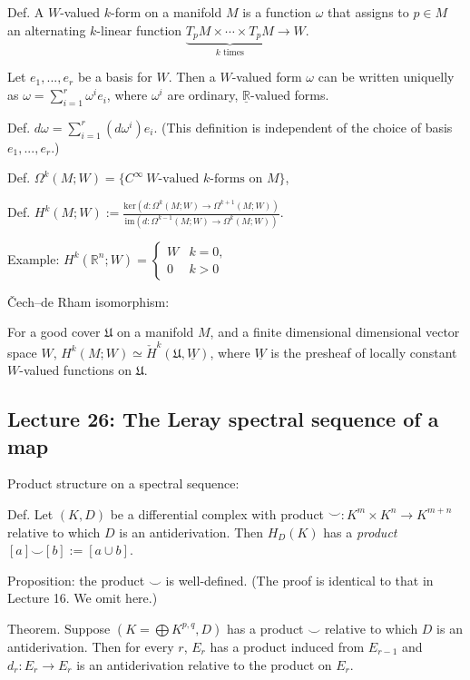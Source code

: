 \documentclass{article}
\theoremstyle{mystyle}
\theoremstyle{remark}
\numberwithin{equation}{section}
\begin{document}
Def. A $W$-valued $k$-form on a manifold $M$ is a function $\omega$ that assigns to $p\in M$ an alternating $k$-linear function $\underbrace{T_pM\times \cdots \times T_pM}_{k\text{ times}}\rightarrow W$. 

Let $e_1,...,e_r$ be a basis for $W$. Then a $W$-valued form $\omega$ can be written uniquelly as $\omega = \sum_{i=1}^r \omega^ie_i$, where $\omega^i$ are ordinary, $\underline{\mathbb{R}}$-valued forms.

Def. $d\omega = \sum_{i=1}^r (d\omega^i)e_i$. (This definition is independent of the choice of basis $e_1,...,e_r$.)

Def. $\Omega^k(M;W)= \{C^\infty~W\text{-valued }k\text{-forms on }M\}$, 

Def. $H^k(M;W):= \frac{\mathrm{ker}\left(d\colon \Omega^k(M;W)\rightarrow \Omega^{k+1}(M;W)\right)}{\mathrm{im}\left(d\colon \Omega^{k-1}(M;W)\rightarrow \Omega^k(M;W)\right)}$. 

Example: $H^k(\mathbb{R}^n;W) = \left\{\begin{array}{ll}W & k=0,\\ 0 &k>0\end{array}\right.$

Čech--de Rham isomorphism:

For a good cover $\mathfrak{U}$ on a manifold $M$, and a finite dimensional dimensional vector space $W$, $H^k(M;W) \simeq \check{H}^k(\mathfrak{U},\underline{W})$, where $\underline{W}$ is the presheaf of locally constant $W$-valued functions on $\mathfrak{U}$. 

\subsection{Lecture 26: The Leray spectral sequence of a map}


Product structure on a spectral sequence:

Def. Let $(K,D)$ be a differential complex with product $\smile \colon K^m\times K^n\rightarrow K^{m+n}$ relative to which $D$ is an antiderivation. Then $H_D(K)$ has a \emph{product} $[a]\smile [b] := [a\cup b]$.

Proposition: the product $\smile$ is well-defined. (The proof is identical to that in Lecture 16. We omit here.)

Theorem. Suppose $(K=\bigoplus K^{p,q},D)$ has a product $\smile$ relative to which $D$ is an antiderivation. Then for every $r$, $E_r$ has a product induced from $E_{r-1}$ and $d_r\colon E_r\rightarrow E_r$ is an antiderivation relative to the product on $E_r$. 
\end{document}
